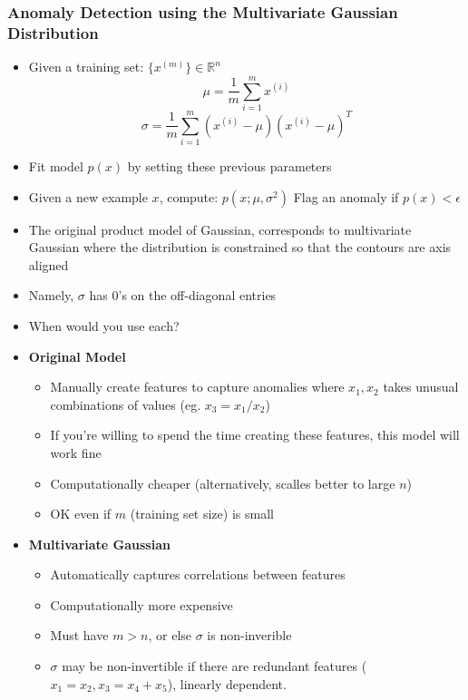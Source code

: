 \subsubsection{Anomaly Detection using the Multivariate Gaussian Distribution}
\begin{itemize}[--]
	\item Given a training set: $\{ x^{(m)}\}\in\mathbb{R}^n$
		$$\mu = \frac{1}{m}\sum_{i=1}^{m} x^{(i)}$$
		$$\sigma = \frac{1}{m}\sum_{i=1}^{m} (x^{(i)}-\mu ) (x^{(i)}-\mu ) ^T$$
	\item Fit model $p(x)$ by setting these previous parameters	
	\item Given a new example $x$, compute:
		$p(x;\mu, \sigma^2)$
		Flag an anomaly if $p(x)<\epsilon$
	\item The original product model of Gaussian, corresponds to multivariate Gaussian where the distribution is constrained so that the contours are axis aligned
	\item Namely, $\sigma$ has 0's on the off-diagonal entries
	\item When would you use each?
	\item \textbf{Original Model}
	\begin{itemize}[--]
		\item Manually create features to capture anomalies where $x_1, x_2$ takes unusual combinations of values (eg. $x_3=x_1/x_2$)
		\item If you're willing to spend the time creating these features, this model will work fine
		\item Computationally cheaper (alternatively, scalles better to large $n$)
		\item OK even if $m$ (training set size) is small
	\end{itemize}

	\item \textbf{Multivariate Gaussian}
	\begin{itemize}[--]
		\item Automatically captures correlations between features
		\item Computationally more expensive
		\item Must have $m>n$, or else $\sigma$ is non-inverible
		\item $\sigma$ may be non-invertible if there are redundant features ($x_1=x_2, x_3 = x_4 + x_5$), linearly dependent.
	\end{itemize}
\end{itemize}